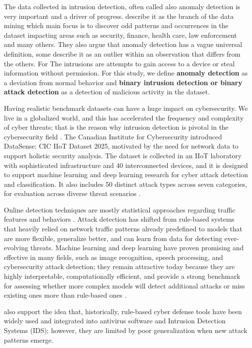 \documentclass[final,5p,times,twocolumn]{elsarticle}
\begin{document}
The data collected in intrusion detection, often called also anomaly detection is very important and a driver of progress. \cite{akoglu2015graph} describe it as the branch of the data mining which main focus is to discover odd patterns and occurrences in the dataset impacting areas such as security, finance, health care, law enforcement and many others. They also argue that anomaly detection has a vague universal definition, some describe it as an outlier within an observation that differs from the others. For \cite{ahmad2025gat} The intrusions are attempts to gain access to a device or steal information without permission. For this study, we define \textbf{anomaly detection} as a deviation from normal behavior and \textbf{binary intrusion detection or binary attack detection} as a detection of malicious activity in the dataset.

Having realistic benchmark datasets can have a huge impact on cybersecurity. We live in a globalized world, and this has accelerated the frequency and complexity of cyber threats; that is the reason why intrusion detection is pivotal in the cybersecurity field \citep{zhong2024survey}. The Canadian Institute for Cybersecurity introduced DataSense: CIC IIoT Dataset 2025, motivated by the need for network data to support holistic security analysis. The dataset is collected in an IIoT laboratory with sophisticated infrastructure and 40 interconnected devices, and it is designed to support machine learning and deep learning research for cyber attack detection and classification. It also includes 50 distinct attack types across seven categories, for evaluation across diverse threat scenarios \citep{unb_iiot_2025}.

Online detection techniques are mostly statistical approaches regarding traffic features and behaviors \citep{zhang2010real}. Attack detection has shifted from rule-based systems that heavily relied on network traffic patterns already predefined to models that are more flexible, generalize better, and can learn from data for detecting ever-evolving threats. Machine learning and deep learning have proven promising and effective in many fields, such as image recognition, speech processing, and cybersecurity attack detection; they remain attractive today because they are highly interpretable, computationally efficient, and provide a strong benchmark for assessing whether more complex models will detect additional attacks or miss existing ones more than rule-based ones \citep{alharthi2025comparative}. 

\cite{bilot2023graph} also support the idea that, historically, rule-based cyber defense tools have been widely used and integrated into antivirus software and Intrusion Detection Systems (IDS); however, they are limited by poor generalization when new attack patterns emerge.
\end{document}

